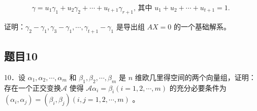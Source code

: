 \documentclass{article}
\begin{document}
\[
\gamma=u_{1} \gamma_{1}+u_{2} \gamma_{2}+\cdots+u_{t+1} \gamma_{r+1} \text {, 其中 } u_{1}+u_{2}+\cdots+u_{t+1}=1 \text {. }
\]

证明：\(\gamma_{2}-\gamma_{1}, \gamma_{3}-\gamma_{1}, \cdots, \gamma_{t+1}-\gamma_{1}\) 是导出组 \(A X=0\) 的一个基础解系。

\subsection{题目10}
10．设 \(\alpha_{1}, \alpha_{2}, \cdots, \alpha_{m}\) 和 \(\beta_{1}, \beta_{2}, \cdots, \beta_{m}\) 是 \(n\) 维欧几里得空间的两个向量组，证明：存在一个正交变换\(\mathcal{A}\) 使得 \(\mathcal{A} \alpha_{i}=\beta_{i}(i=1,2, \cdots, m)\) 的充分必要条件为 \(\left(\alpha_{i}, \alpha_{j}\right)=\left(\beta_{i}, \beta_{j}\right)(i, j=1,2, \cdots, m)\) 。
\end{document}
